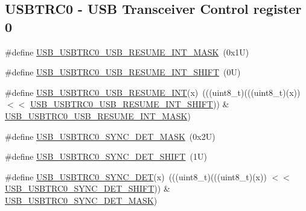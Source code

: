\subsection*{U\+S\+B\+T\+R\+C0 -\/ U\+SB Transceiver Control register 0}
\begin{DoxyCompactItemize}
\item 
\#define \mbox{\hyperlink{group___u_s_b___register___masks_ga9c943cc95fdf52fa40311292f2801518}{U\+S\+B\+\_\+\+U\+S\+B\+T\+R\+C0\+\_\+\+U\+S\+B\+\_\+\+R\+E\+S\+U\+M\+E\+\_\+\+I\+N\+T\+\_\+\+M\+A\+SK}}~(0x1\+U)
\item 
\#define \mbox{\hyperlink{group___u_s_b___register___masks_ga48af1176ed5d811c299eb123f934425d}{U\+S\+B\+\_\+\+U\+S\+B\+T\+R\+C0\+\_\+\+U\+S\+B\+\_\+\+R\+E\+S\+U\+M\+E\+\_\+\+I\+N\+T\+\_\+\+S\+H\+I\+FT}}~(0\+U)
\item 
\#define \mbox{\hyperlink{group___u_s_b___register___masks_gaa9f049670f81705c2d16d233d26fcdef}{U\+S\+B\+\_\+\+U\+S\+B\+T\+R\+C0\+\_\+\+U\+S\+B\+\_\+\+R\+E\+S\+U\+M\+E\+\_\+\+I\+NT}}(x)~(((uint8\+\_\+t)(((uint8\+\_\+t)(x)) $<$$<$ \mbox{\hyperlink{group___u_s_b___register___masks_ga48af1176ed5d811c299eb123f934425d}{U\+S\+B\+\_\+\+U\+S\+B\+T\+R\+C0\+\_\+\+U\+S\+B\+\_\+\+R\+E\+S\+U\+M\+E\+\_\+\+I\+N\+T\+\_\+\+S\+H\+I\+FT}})) \& \mbox{\hyperlink{group___u_s_b___register___masks_ga9c943cc95fdf52fa40311292f2801518}{U\+S\+B\+\_\+\+U\+S\+B\+T\+R\+C0\+\_\+\+U\+S\+B\+\_\+\+R\+E\+S\+U\+M\+E\+\_\+\+I\+N\+T\+\_\+\+M\+A\+SK}})
\item 
\#define \mbox{\hyperlink{group___u_s_b___register___masks_ga2e2f3b4bb79885ed92d75c9f86d42e23}{U\+S\+B\+\_\+\+U\+S\+B\+T\+R\+C0\+\_\+\+S\+Y\+N\+C\+\_\+\+D\+E\+T\+\_\+\+M\+A\+SK}}~(0x2\+U)
\item 
\#define \mbox{\hyperlink{group___u_s_b___register___masks_ga986ea3386acad15ab845a8c5d9644c9e}{U\+S\+B\+\_\+\+U\+S\+B\+T\+R\+C0\+\_\+\+S\+Y\+N\+C\+\_\+\+D\+E\+T\+\_\+\+S\+H\+I\+FT}}~(1\+U)
\item 
\#define \mbox{\hyperlink{group___u_s_b___register___masks_gaa41ec146d75f9df502036a725d938eb2}{U\+S\+B\+\_\+\+U\+S\+B\+T\+R\+C0\+\_\+\+S\+Y\+N\+C\+\_\+\+D\+ET}}(x)~(((uint8\+\_\+t)(((uint8\+\_\+t)(x)) $<$$<$ \mbox{\hyperlink{group___u_s_b___register___masks_ga986ea3386acad15ab845a8c5d9644c9e}{U\+S\+B\+\_\+\+U\+S\+B\+T\+R\+C0\+\_\+\+S\+Y\+N\+C\+\_\+\+D\+E\+T\+\_\+\+S\+H\+I\+FT}})) \& \mbox{\hyperlink{group___u_s_b___register___masks_ga2e2f3b4bb79885ed92d75c9f86d42e23}{U\+S\+B\+\_\+\+U\+S\+B\+T\+R\+C0\+\_\+\+S\+Y\+N\+C\+\_\+\+D\+E\+T\+\_\+\+M\+A\+SK}})
\item 

\end{DoxyCompactItemize}
